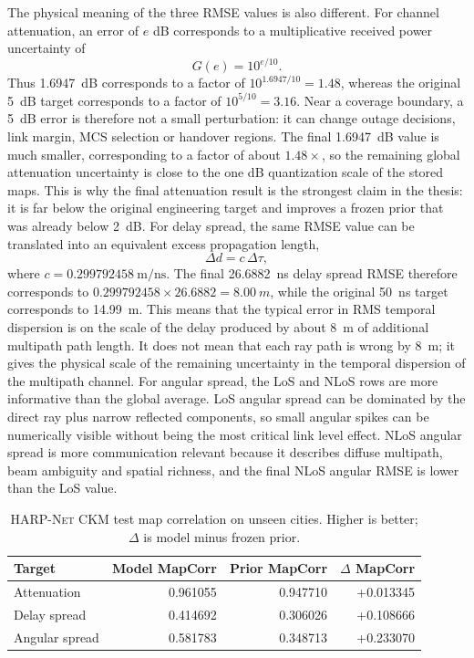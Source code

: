 The physical meaning of the three RMSE values is also different. For channel
attenuation, an error of \(e\) dB corresponds to a multiplicative received
power uncertainty of
\begin{equation}
  G(e) = 10^{e/10}.
\end{equation}
Thus \SI{1.6947}{dB} corresponds to a factor of \(10^{1.6947/10}=1.48\),
whereas the original \SI{5}{dB} target corresponds to a factor of
\(10^{5/10}=3.16\). Near a coverage boundary, a \SI{5}{dB} error is therefore
not a small perturbation: it can change outage decisions, link margin, MCS
selection or handover regions. The final \SI{1.6947}{dB} value is much smaller,
corresponding to a factor of about \(1.48\times\), so the remaining global
attenuation uncertainty is close to the one dB quantization scale of the stored
maps. This is why the final attenuation result is the strongest claim in the
thesis: it is far below the original engineering target and improves a frozen
prior that was already below \SI{2}{dB}. For delay spread,
the same RMSE value can be translated into an equivalent excess propagation
length,
\begin{equation}
  \Delta d = c\,\Delta \tau,
\end{equation}
where \(c=0.299792458~\mathrm{m/ns}\). The final
\SI{26.6882}{ns} delay spread RMSE therefore corresponds to
\(0.299792458\times 26.6882=\SI{8.00}{m}\), while the original
\SI{50}{ns} target corresponds to \SI{14.99}{m}. This means that the typical
error in RMS temporal dispersion is on the scale of the delay produced by
about \SI{8}{m} of additional multipath path length. It does not mean that each
ray path is wrong by \SI{8}{m}; it gives the physical scale of the remaining
uncertainty in the temporal dispersion of the multipath channel. For angular
spread, the LoS and NLoS rows are more informative than the global average.
LoS angular spread can be dominated by the direct ray plus narrow reflected
components, so small angular spikes can be numerically visible without being
the most critical link level effect. NLoS angular spread is more communication
relevant because it describes diffuse multipath, beam ambiguity and spatial
richness, and the final NLoS angular RMSE is lower than the LoS value.

\begin{table}[!htbp]
\centering
\caption[\textsc{HARP-Net CKM} test map correlation on unseen cities.]%
{\textsc{HARP-Net CKM} test map correlation on unseen cities. Higher is better;
\(\Delta\) is model minus frozen prior.}
\label{tab:try80_final_test_mapcorr}
\scriptsize
\begin{tabular}{lrrr}
\toprule
Target & Model MapCorr & Prior MapCorr & \(\Delta\) MapCorr \\
\midrule
Attenuation & 0.961055 & 0.947710 & +0.013345 \\
Delay spread & 0.414692 & 0.306026 & +0.108666 \\
Angular spread & 0.581783 & 0.348713 & +0.233070 \\
\bottomrule
\end{tabular}
\end{table}

